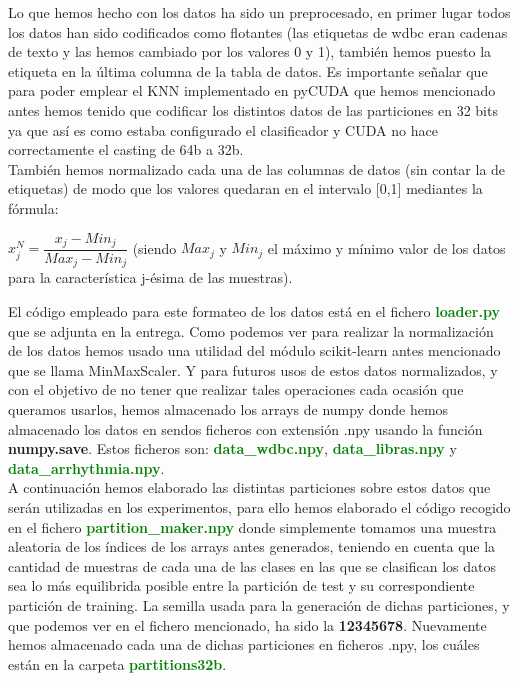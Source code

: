 \documentclass[10pt,a4paper]{article}
\begin{document}
Lo que hemos hecho con los datos ha sido un preprocesado, en primer lugar todos los datos han sido codificados como flotantes (las etiquetas de wdbc eran cadenas de texto y las hemos cambiado por los valores 0 y 1), también hemos puesto la etiqueta en la última columna de la tabla de datos. Es importante señalar que para poder emplear el KNN implementado en pyCUDA que hemos mencionado antes hemos tenido que codificar los distintos datos de las particiones en 32 bits ya que así es como estaba configurado el clasificador y CUDA no hace correctamente el casting de 64b a 32b.\\

También hemos normalizado cada una de las columnas de datos (sin contar la de etiquetas) de modo que los valores quedaran en el intervalo [0,1] mediantes la fórmula:\\

\begin{center}
$x_j^N = \dfrac{x_j - Min_j}{Max_j-Min_j}$ (siendo $Max_j$ y $Min_j$ el máximo y mínimo valor de los datos para la característica j-ésima de las muestras).
\end{center}

El código empleado para este formateo de los datos está en el fichero \textbf{\textcolor{green}{loader.py}} que se adjunta en la entrega. Como podemos ver para realizar la normalización de los datos hemos usado una utilidad del módulo scikit-learn antes mencionado que se llama MinMaxScaler. Y para futuros usos de estos datos normalizados, y con el objetivo de no tener que realizar tales operaciones cada ocasión que queramos usarlos, hemos almacenado los arrays de numpy donde hemos almacenado los datos en sendos ficheros con extensión .npy usando la función \textbf{numpy.save}. Estos ficheros son: \textbf{\textcolor{green}{data\_wdbc.npy}}, \textbf{\textcolor{green}{data\_libras.npy}} y \textbf{\textcolor{green}{data\_arrhythmia.npy}}.\\

A continuación hemos elaborado las distintas particiones sobre estos datos que serán utilizadas en los experimentos, para ello hemos elaborado el código recogido en el fichero \textbf{\textcolor{green}{partition\_maker.npy}} donde simplemente tomamos una muestra aleatoria de los índices de los arrays antes generados, teniendo en cuenta que la cantidad de muestras de cada una de las clases en las que se clasifican los datos sea lo más equilibrida posible entre la partición de test y su correspondiente partición de training. La semilla usada para la generación de dichas particiones, y que podemos ver en el fichero mencionado, ha sido la \textbf{12345678}. Nuevamente hemos almacenado cada una de dichas particiones en ficheros .npy, los cuáles están en la carpeta \textbf{\textcolor{green}{partitions32b}}.\\
\end{document}
